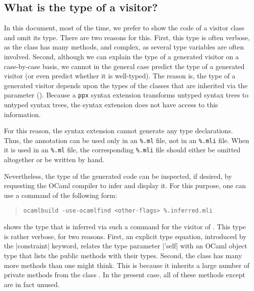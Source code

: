 \documentclass[11pt,a4paper,twoside]{article}
\begin{document}

\subsection{What is the type of a visitor?}
\label{sec:intro:type}

In this document, most of the time, we prefer to show the code of a visitor
class and omit its type. There are two reasons for this. First, this type is
often verbose, as the class has many methods, and complex, as several type
variables are often involved. Second, although we can explain the type of a
generated visitor on a case-by-case basis, we cannot in the general case
predict the type of a generated visitor (or even predict whether it is
well-typed). The reason is, the type of a generated visitor depends upon the
types of the classes that are inherited via the \ancestors parameter
(). Because a \texttt{ppx} syntax extension transforms
untyped syntax trees to untyped syntax trees, the \visitors syntax extension
does not have access to this information.

For this reason, the \visitors syntax extension cannot generate any type
declarations. Thus, the annotation \derivingvisitors can be used only in an
\texttt{\%.ml} file, not in an \texttt{\%.mli} file. When it is used in an
\texttt{\%.ml} file, the corresponding \texttt{\%.mli} file should either be
omitted altogether or be written by hand.



Nevertheless, the type of the generated code can be inspected, if desired, by
requesting the OCaml compiler to infer and display it. For this purpose, one
can use a command of the following form:
\begin{quote}
\verb|ocamlbuild -use-ocamlfind <other-flags> %.inferred.mli|
\end{quote}

 shows the type that is inferred via such a command for the
\iter visitor of . This type is rather verbose, for two
reasons. First, an explicit type equation, introduced by the \oc|constraint|
keyword, relates the type parameter \oc|'self| with an OCaml object type that
lists the public methods with their types. Second, the class \iter has many more
methods than one might think. This is because it inherits a large number of
private methods from the class . In the present case, all of
these methods except  are in fact unused.
\end{document}
